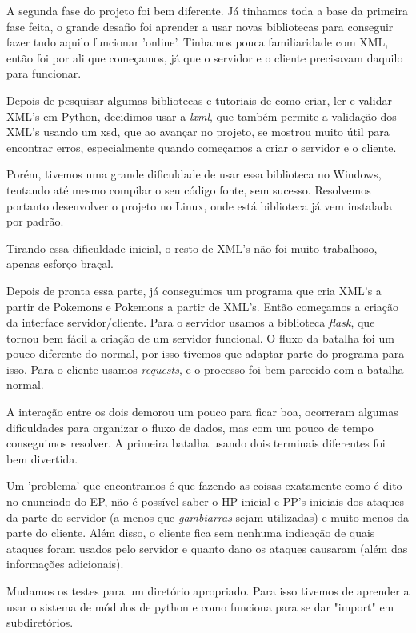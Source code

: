 \documentclass[a4paper]{article}
\begin{document}
  A segunda fase do projeto foi bem diferente. Já tinhamos toda a base da primeira fase
feita, o grande desafio foi aprender a usar novas bibliotecas para conseguir fazer tudo
aquilo funcionar 'online'. Tinhamos pouca familiaridade com XML, então foi por ali que 
começamos, já que o servidor e o cliente precisavam daquilo para funcionar.

   Depois de pesquisar algumas bibliotecas e tutoriais de como criar, ler e validar XML's
em Python, decidimos usar a \emph{lxml}, que também permite a validação dos XML's usando
um xsd, que ao avançar no projeto, se mostrou muito útil para encontrar erros, especialmente quando
começamos a criar o servidor e o cliente.

   Porém, tivemos uma grande dificuldade de usar essa biblioteca no Windows, tentando até
mesmo compilar o seu código fonte, sem sucesso. Resolvemos portanto desenvolver o projeto no
Linux, onde está biblioteca já vem instalada por padrão. 

    Tirando essa dificuldade inicial, o resto de XML's não foi muito trabalhoso, apenas
esforço braçal.

   Depois de pronta essa parte, já conseguimos um programa que cria XML's a partir de
Pokemons e Pokemons a partir de XML's. Então começamos a criação da interface servidor/cliente.
Para o servidor usamos a biblioteca \emph{flask}, que tornou bem fácil a criação de um servidor
funcional. O fluxo da batalha foi um pouco diferente do normal, por isso tivemos que adaptar
parte do programa para isso. Para o cliente usamos \emph{requests}, e o processo foi bem parecido
com a batalha normal.

   A interação entre os dois demorou um pouco para ficar boa, ocorreram algumas dificuldades
para organizar o fluxo de dados, mas com um pouco de tempo conseguimos resolver. A primeira batalha
usando dois terminais diferentes foi bem divertida.

   Um 'problema' que encontramos é que fazendo as coisas exatamente como é dito no enunciado
do EP, não é possível saber o HP inicial e PP's iniciais dos ataques da parte do servidor (a 
menos que \emph{gambiarras} sejam utilizadas) e muito menos da parte do cliente. Além disso, o
cliente fica sem nenhuma indicação de quais ataques foram usados pelo servidor e quanto dano
os ataques causaram (além das informações adicionais).

   Mudamos os testes para um diretório apropriado. Para isso tivemos de aprender a usar o
sistema de módulos de python e como funciona para se dar "import" em subdiretórios.
\end{document}
